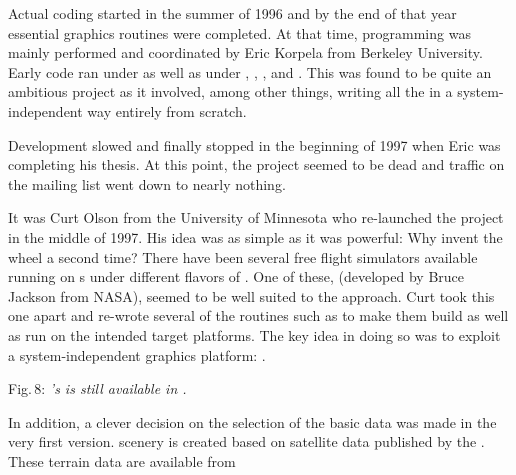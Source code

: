 Actual coding started in the summer of 1996 and by the end of that year essential
graphics routines were completed. At that time, programming was mainly performed and
coordinated by Eric Korpela from Berkeley University. Early code ran
under  as well as under , , ,
and . This was found to be quite an ambitious project as it involved, among
other things, writing all the  in a system-independent way
entirely from scratch.

Development slowed and finally stopped in the beginning of 1997 when Eric was completing
his thesis. At this point, the project seemed to be dead and traffic on the mailing list
went down to nearly nothing.

It was Curt Olson from the University of Minnesota who re-launched the
project in the middle of 1997. His idea was as simple as it was powerful: Why invent the
wheel a second time? There have been several free flight simulators available running on s under different flavors of
. One of these,  (developed by Bruce Jackson from NASA), seemed to be well suited to the approach. Curt took this one apart and
re-wrote several of the routines such as to make them build as well as run on the
intended target platforms. The key idea in doing so was to exploit a system-independent
graphics platform: .
\medskip

 \centerline{}

\smallskip
 \noindent
Fig.\,8: \textit{'s  is still available in \FlightGear.}
\medskip

In addition, a clever decision on the selection of the basic  data was
made in the very first version. \FlightGear{} scenery is created based on satellite data
published by the . These terrain data are available from
 \medskip

